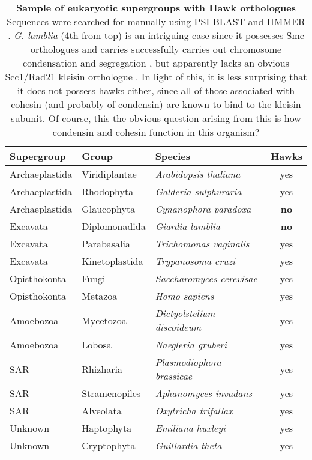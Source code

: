 \documentclass[a4paper,11pt,twoside,openright]{scrbook}
\begin{document}
\begin{table}[h]
    \captionsetup{width=0.85\linewidth}
    \caption[Sample of eukaryotic supergroups with Hawk orthologues]{\sffamily \textbf{Sample of eukaryotic supergroups with Hawk orthologues} \\ \small Sequences were searched for manually using PSI-BLAST and HMMER \cite{Altschul1997,Finn2011}. \textit{G. lamblia} (4th from top) is an intriguing case since it possesses Smc orthologues and carries successfully carries out chromosome condensation and segregation \cite{Tumova2015}, but apparently lacks an obvious Scc1/Rad21 kleisin orthologue \cite{Eme2011,Tumova2015}. In light of this, it is less surprising that it does not possess hawks either, since all of those associated with cohesin (and probably of condensin) are known to bind to the kleisin subunit. Of course, this the obvious question arising from this is how condensin and cohesin function in this organism?}
    \centering
    \onehalfspacing
    \begin{tabular}{l l l c}
    \hline
    Supergroup  & Group   &  Species &   Hawks\\[0.1cm]
    \hline
Archaeplastida &   Viridiplantae  &   \textit{Arabidopsis thaliana}     &  yes\\
Archaeplastida &   Rhodophyta     &   \textit{Galderia sulphuraria}     &  yes\\
Archaeplastida &   Glaucophyta    &   \textit{Cynanophora paradoxa}     &  \textbf{no}\\
Excavata       &   Diplomonadida  &   \textit{Giardia lamblia}          &  \textbf{no}\\
Excavata       &   Parabasalia    &   \textit{Trichomonas vaginalis}    &  yes\\
Excavata       &   Kinetoplastida &   \textit{Trypanosoma cruzi}        &  yes\\
Opisthokonta   &   Fungi          &   \textit{Saccharomyces cerevisae}  &  yes\\
Opisthokonta   &   Metazoa        &   \textit{Homo sapiens}             &  yes\\
Amoebozoa      &   Mycetozoa      &   \textit{Dictyolstelium discoideum}&  yes\\
Amoebozoa      &   Lobosa         &   \textit{Naegleria gruberi}        &  yes\\
SAR            &   Rhizharia      &   \textit{Plasmodiophora brassicae} &  yes\\
SAR            &   Stramenopiles  &   \textit{Aphanomyces invadans}     &  yes\\
SAR            &   Alveolata      &   \textit{Oxytricha trifallax}      &  yes\\
Unknown        &   Haptophyta     &   \textit{Emiliana huxleyi}         &  yes\\
Unknown        &   Cryptophyta    &   \textit{Guillardia theta}         &  yes\\
[0.1cm]
    \hline
    \end{tabular}
    \label{table:eukaryotehawks}
\end{table}
\end{document}
